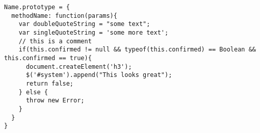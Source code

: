 
\begin{lstlisting}[caption=My Javascript Example]
Name.prototype = {
  methodName: function(params){
    var doubleQuoteString = "some text";
    var singleQuoteString = 'some more text';
    // this is a comment
    if(this.confirmed != null && typeof(this.confirmed) == Boolean && this.confirmed == true){
      document.createElement('h3');
      $('#system').append("This looks great");
      return false;
    } else {
      throw new Error;
    }
  }
}
\end{lstlisting}